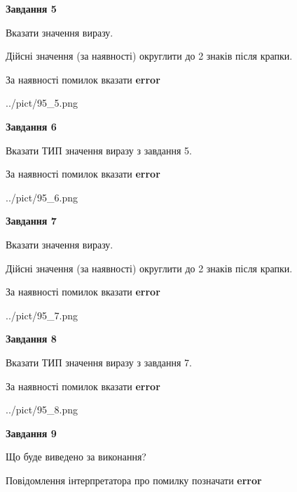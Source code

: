 \documentclass[11pt, ukrainian]{article}
\begin{document}
{\begin {large}
{\begin {center}\textbf{Завдання 5}\end {center}}\par
Вказати значення виразу. \par
Дійсні значення (за наявності) округлити до 2 знаків після крапки. \par
За наявності помилок вказати \textbf{error}

\begin{center}
	{../pict/95_5.png}
\end{center}
\newpage

{\begin {center}\textbf{Завдання 6}\end {center}}\par
Вказати ТИП значення виразу з завдання 5. \par
За наявності помилок вказати \textbf{error}

\begin{center}
	{../pict/95_6.png}
\end{center}
\newpage

{\begin {center}\textbf{Завдання 7}\end {center}}\par
Вказати значення виразу. \par
Дійсні значення (за наявності) округлити до 2 знаків після крапки. \par
За наявності помилок вказати \textbf{error}

\begin{center}
	{../pict/95_7.png}
\end{center}
\newpage

{\begin {center}\textbf{Завдання 8}\end {center}}\par
Вказати ТИП значення виразу з завдання 7. \par
За наявності помилок вказати \textbf{error}

\begin{center}
	{../pict/95_8.png}
\end{center}
\newpage

{\begin {center}\textbf{Завдання 9}\end {center}}\par
Що буде виведено за виконання? \par
Повідомлення інтерпретатора про помилку позначати \textbf{error}


\end{large}}
\end{document}
